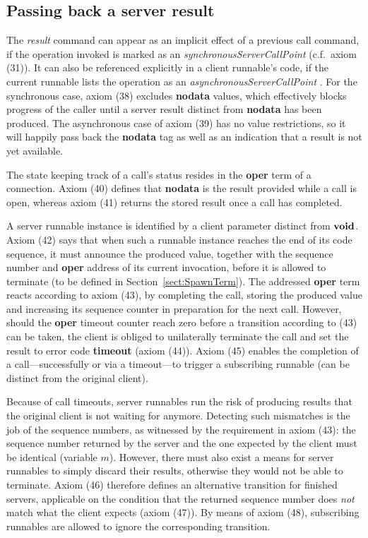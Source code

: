 \documentclass[10pt,conference]{IEEEtran}
\begin{document}
\subsection{Passing back a server result} \label{sect:Res}

The \emph{result} command can appear as an implicit effect of a previous call command, if the operation invoked is marked as an \emph{synchronousServerCallPoint} (c.f.\ axiom (31)). It can also be referenced explicitly in a client runnable's code, if the current runnable lists the operation as an \emph{asynchronousServerCallPoint} \cite[ch.~5.6.14]{AR:RTE}. For the synchronous case, axiom (38) excludes \textbf{nodata} values, which effectively blocks progress of the caller until a server result distinct from \textbf{nodata} has been produced. The asynchronous case of axiom (39) has no value restrictions, so it will happily pass back the \textbf{nodata} tag as well as an indication that a result is not yet available.

The state keeping track of a call's status resides in the \textbf{oper} term of a connection. Axiom (40) defines that \textbf{nodata} is the result provided while a call is open, whereas axiom (41) returns the stored result once a call has completed.

A server runnable instance is identified by a client parameter distinct from $\textbf{void}$. Axiom (42) says that when such a runnable instance reaches the end of its code sequence, it must announce the produced value, together with the sequence number and \textbf{oper} address of its current invocation, before it is allowed to terminate (to be defined in Section~\ref{sect:SpawnTerm}). The addressed \textbf{oper} term reacts according to axiom (43), by completing the call, storing the produced value and increasing its sequence counter in preparation for the next call. However, should the \textbf{oper} timeout counter reach zero before a transition according to (43) can be taken, the client is obliged to unilaterally terminate the call and set the result to error code \textbf{timeout} (axiom (44)). Axiom (45) enables the completion of a call---successfully or via a timeout---to trigger a subscribing runnable (can be distinct from the original client).

Because of call timeouts, server runnables run the risk of producing results that the original client is not waiting for anymore. Detecting such mismatches is the job of the sequence numbers, as witnessed by the requirement in axiom (43): the sequence number returned by the server and the one expected by the client must be identical (variable $m$). However, there must also exist a means for server runnables to simply discard their results, otherwise they would not be able to terminate. Axiom (46) therefore defines an alternative transition for finished servers, applicable on the condition that the returned sequence number does \emph{not} match what the client expects (axiom (47)). By means of axiom (48), subscribing runnables are allowed to ignore the corresponding transition.
\end{document}
